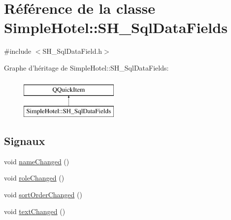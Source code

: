\hypertarget{classSimpleHotel_1_1SH__SqlDataFields}{\section{Référence de la classe Simple\-Hotel\-:\-:S\-H\-\_\-\-Sql\-Data\-Fields}
\label{classSimpleHotel_1_1SH__SqlDataFields}
}


{\ttfamily \#include $<$S\-H\-\_\-\-Sql\-Data\-Field.\-h$>$}

Graphe d'héritage de Simple\-Hotel\-:\-:S\-H\-\_\-\-Sql\-Data\-Fields\-:\begin{figure}[H]
\begin{center}
\leavevmode
\includegraphics[height=2.000000cm]{classSimpleHotel_1_1SH__SqlDataFields}
\end{center}
\end{figure}
\subsection*{Signaux}
\begin{DoxyCompactItemize}
\item 
void \hyperlink{classSimpleHotel_1_1SH__SqlDataFields_aee3dfbdb1f1a6b3d1add723a2ef0b528}{name\-Changed} ()
\item 
void \hyperlink{classSimpleHotel_1_1SH__SqlDataFields_aadca7d9a581e99aba54a2d8d031d9298}{role\-Changed} ()
\item 
void \hyperlink{classSimpleHotel_1_1SH__SqlDataFields_ab907a2c306e84482aa1841c23048c2c7}{sort\-Order\-Changed} ()
\item 
void \hyperlink{classSimpleHotel_1_1SH__SqlDataFields_a02aa5ae4926e0a12c7a459da06cfda74}{text\-Changed} ()
\end{DoxyCompactItemize}
